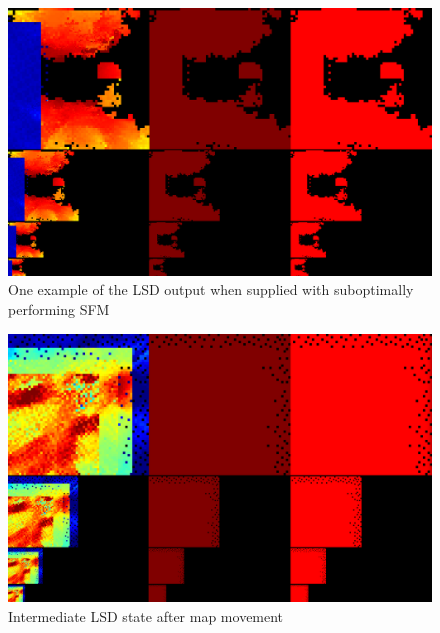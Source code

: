 \begin{figure}[h]
    \centering
    \includegraphics[scale=0.25]{images/evaluation/SFM_issues/Screenshot from 2024-06-19 20-16-22.png}
    \caption{One example of the LSD output when supplied with suboptimally performing SFM}
    \label{fig:SFM_issue_1}
\end{figure} 

\begin{figure}[h]
    \centering
    \includegraphics[scale=0.25]{images/evaluation/SFM_issues/Screenshot from 2024-06-20 14-41-06.png}
    \caption{Intermediate LSD state after map movement}
    \label{fig:SFM_movement1}
\end{figure}

